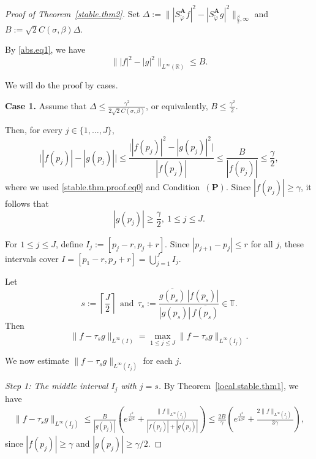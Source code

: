 \documentclass[11pt, reqno]{amsart}
\newcommand{\R}{\mathbb{R}}
\numberwithin{equation}{section}
\begin{document}
\begin{proof}[Proof of Theorem~\ref{stable.thm2}]
Set
$\Delta := \bigl\| |S_{\check{\varphi}}^{\mathbf A}f|^2 - |S_{\check{\varphi}}^{\mathbf A}g|^2\bigr\|_{\frac{\beta}{2},\infty} $ 
and
 $B:=\sqrt{2}C(\sigma,\beta)\Delta.$ 

By \eqref{abs.eq1}, we have
\begin{equation}\label{stable.thm.proof.eq0}
\bigl\||f|^2-|g|^2\bigr\|_{L^\infty(\R)} \le B.
\end{equation}

We will do the proof by cases.
 
\smallskip
\noindent
\textbf{Case 1.} Assume that $\Delta\le \frac{\gamma^2}{2\sqrt{2}C(\sigma,\beta)}$, or equivalently,
$ B\le \frac{\gamma^2}{2}$. 

Then, for every $j\in\{1,\dots,J\}$,
$$\bigl||f(p_j)|-|g(p_j)|\bigr| \le \frac{\bigl||f(p_j)|^2-|g(p_j)|^2\bigr|}{|f(p_j)|} \le
\frac{B}{|f(p_j)|} \le \frac{\gamma}{2},$$
where we used \eqref{stable.thm.proof.eq0} and Condition~$(\mathbf P)$. Since
$|f(p_j)|\ge \gamma$, it follows that
$$ |g(p_j)|\ge \frac{\gamma}{2}, \ 1\le j\le J. $$

For $1\le j\le J$, define $ I_j:=[p_j-r,p_j+r].$ Since $|p_{j+1}-p_j|\le r$ for all $j$, these intervals cover $ I=[p_1-r,p_J+r]=\bigcup_{j=1}^J I_j.$

Let
$$ s:=\left\lceil \frac{J}{2}\right\rceil
 \ \ \text{and} \ \
\tau_s:=\frac{\overline{g(p_s)}\,|f(p_s)|}{|g(p_s)|\,\overline{f(p_s)}}\in\mathbb T. $$
Then
$$ \|f-\tau_s g\|_{L^\infty(I)} = \max_{1\le j\le J}\|f-\tau_s g\|_{L^\infty(I_j)}.$$

We now estimate $\|f-\tau_s g\|_{L^\infty(I_j)}$ for each $j$.

\medskip
\noindent
\emph{Step 1: The middle interval \(I_j\) with $j=s$.} 
By Theorem~\ref{local.stable.thm1}, we have 
 \begin{align}\label{stable.thm.eq.middle}
        \| f - \tau_s g \|_{L^{\infty} (I_j)} \le \frac{B}{|g(p_j)|} \left( e^{\frac{r^2}{4\sigma^2}} + \frac{\|f\|_{L^\infty(I_j)}}{|f(p_j)| + |g(p_j)|} \right)  \le \frac{2B}{\gamma} \left( e^{\frac{r^2}{4\sigma^2}} + \frac{2 \|f\|_{L^\infty(I_j)}}{3\gamma} \right), 
    \end{align}
since $|f(p_j)|\ge \gamma$ and $|g(p_j)|\ge \gamma/2$.


\end{proof}
\end{document}
